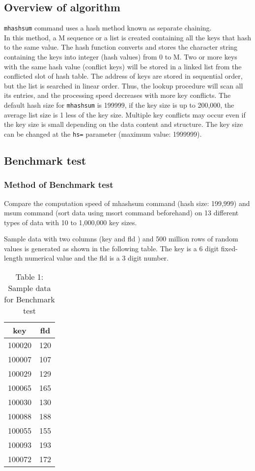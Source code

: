 \subsection*{Overview of algorithm}
\verb|mhashsum| command uses a hash method known as separate chaining. \\
In this method, a M sequence or a list is created containing all the keys that hash to the same value. The hash function converts and stores the character string containing the keys into integer  (hash values) from 0 to M. Two or more keys with the same hash value (conflict keys) will be stored in a linked list from the conflicted slot of hash table.  The address of keys are stored in sequential order, but the list is searched in linear order. Thus, the lookup procedure will scan all its entries, and the processing speed decreases with more key conflicts. 
The default hash size for \verb|mhashsum| is 199999, if the key size is up to 200,000, the average list size is 1 less of the key size. Multiple key conflicts may occur even if the key size is small depending on the data content and structure. The key size can be changed at the \verb|hs=| parameter (maximum value: 1999999). 

\subsection*{Benchmark test}
\subsubsection*{Method of Benchmark test}
Compare the computation speed of mhashsum command (hash size: 199,999) and msum command (sort data using msort command beforehand) on 13 different types of data with 10 to 1,000,000 key sizes. 

Sample data with two columns (key and fld ) and 500 million rows of random values is generated as shown in the following table. 
The key is a 6 digit fixed-length numerical value and the fld is a 3 digit number. 

\begin{table}[h]
\begin{center}
 \caption{Table 1: Sample data for Benchmark test }
 \begin{tabular}{|c|c|}
  \hline
key & fld \\ \hline \hline
100020&120 \\ \hline
100007&107 \\ \hline
100029&129 \\ \hline
100065&165 \\ \hline
100030&130 \\ \hline
100088&188 \\ \hline
100055&155 \\ \hline
100093&193 \\ \hline
100072&172 \\ \hline
 \end{tabular}
\end{center}
\end{table}

